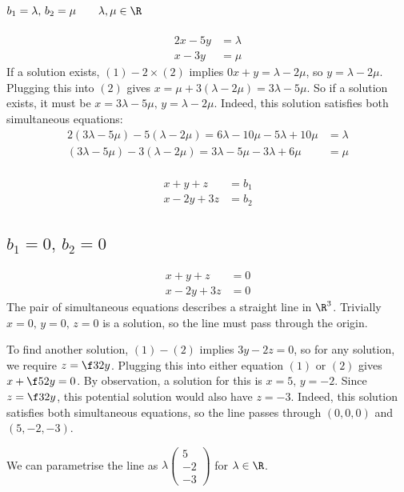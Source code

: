 \documentclass[a4paper]{article}
\begin{document}
\subsection{$b_1 = \lambda,\, b_2 = \mu \qquad \lambda, \mu \in \R$}
\begin{align*}
2x - 5y &= \lambda \tag{1}\\
x - 3y &= \mu \tag{2}
\end{align*}
If a solution exists, $(1) - 2 \times (2)$ implies $0x + y = \lambda - 2\mu$, so $y=\lambda - 2\mu$. Plugging this into $(2)$ gives $x = \mu + 3(\lambda - 2\mu) = 3\lambda - 5\mu$.
So if a solution exists, it must be $x=3\lambda - 5\mu,\, y=\lambda - 2\mu$. Indeed, this solution satisfies both simultaneous equations:
\begin{align*}
2(3\lambda - 5\mu) - 5(\lambda - 2\mu) = 6\lambda - 10\mu - 5\lambda + 10\mu &= \lambda\\
(3\lambda - 5\mu) - 3(\lambda - 2\mu) = 3\lambda - 5\mu - 3\lambda + 6\mu &= \mu\\
\end{align*}


\begin{align*}
x + y + z &= b_1\\
x - 2y + 3z &= b_2
\end{align*}

\subsection{$b_1 = 0,\, b_2 = 0$}

\begin{align*}
x + y + z &= 0 \tag{1}\\
x - 2y + 3z &= 0 \tag{2}
\end{align*}
The pair of simultaneous equations describes a straight line in $\R^3$. Trivially $x=0,\, y=0,\, z=0$ is a solution, so the line must pass through the origin.

To find another solution, $(1)-(2)$ implies $3y-2z=0$, so for any solution, we require $z = \f32 y$. Plugging this into either equation $(1)$ or $(2)$ gives $x + \f52 y = 0$. By observation, a solution for this is $x=5,\, y=-2$. Since $z=\f32 y$, this potential solution would also have $z=-3$. Indeed, this solution satisfies both simultaneous equations, so the line passes through $(0, 0, 0)$ and $(5, -2, -3)$.

We can parametrise the line as $\lambda \begin{pmatrix}5\\ -2\\ -3\end{pmatrix}$ for $\lambda \in \R$.
\end{document}
